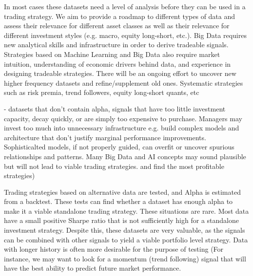 \documentclass[a4paper]{article}
\begin{document}

 In most cases these datasets need a level of analysis
before they can be used in a trading strategy. We aim to provide a roadmap to different types of data and assess their
relevance for different asset classes as well as their relevance for different investment styles (e.g. macro, equity long-short,
etc.). Big Data requires new analytical skills and
infrastructure in order to derive tradeable signals. Strategies based on Machine Learning and Big Data also require market
intuition, understanding of economic drivers behind data, and experience in designing tradeable strategies. There will be an ongoing
effort to uncover new higher frequency datasets and refine/supplement old ones. Systematic strategies such as risk
premia, trend followers, equity long-short quants, etc

- datasets that don’t contain alpha, signals that have too little
investment capacity, decay quickly, or are simply too expensive to purchase. Managers may invest too much into
unnecessary infrastructure e.g. build complex models and architecture that don’t justify marginal performance
improvements. Sophisticalted models, if not properly
guided, can overfit or uncover spurious relationships and patterns.  Many Big Data and AI
concepts may sound plausible but will not lead to viable trading strategies.  and find the most profitable
strategies)

Trading strategies based on alternative data are tested, and Alpha is estimated from a backtest. These tests can find
whether a dataset has enough alpha to make it a viable standalone trading strategy. These situations are rare. Most data
have a small positive Sharpe ratio that is not sufficiently high for a standalone investment strategy. Despite this, these
datasets are very valuable, as the signals can be combined with other signals to yield a viable portfolio level strategy.  Data with longer history is often
more desirable for the purpose of testing (For instance, we may want to look for a momentum
(trend following) signal that will have the best ability to predict future market performance. 
\end{document}
